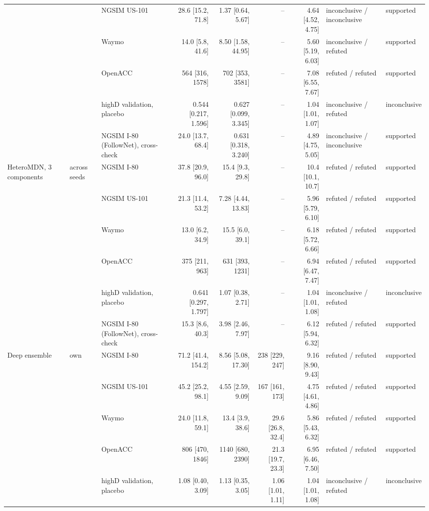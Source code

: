 \begin{longtable}{lllrrrrll}
 &  & NGSIM US-101 & 28.6 [15.2, 71.8] & 1.37 [0.64, 5.67] & -- & 4.64 [4.52, 4.75] & inconclusive / inconclusive & supported \\
 &  & Waymo & 14.0 [5.8, 41.6] & 8.50 [1.58, 44.95] & -- & 5.60 [5.19, 6.03] & inconclusive / refuted & supported \\
 &  & OpenACC & 564 [316, 1578] & 702 [353, 3581] & -- & 7.08 [6.55, 7.67] & refuted / refuted & supported \\
 &  & highD validation, placebo & 0.544 [0.217, 1.596] & 0.627 [0.099, 3.345] & -- & 1.04 [1.01, 1.07] & inconclusive / refuted & inconclusive \\
 &  & NGSIM I-80 (FollowNet), cross-check & 24.0 [13.7, 68.4] & 0.631 [0.318, 3.240] & -- & 4.89 [4.75, 5.05] & inconclusive / inconclusive & supported \\
\midrule
HeteroMDN, 3 components & across seeds & NGSIM I-80 & 37.8 [20.9, 96.0] & 15.4 [9.3, 29.8] & -- & 10.4 [10.1, 10.7] & refuted / refuted & supported \\
 &  & NGSIM US-101 & 21.3 [11.4, 53.2] & 7.28 [4.44, 13.83] & -- & 5.96 [5.79, 6.10] & refuted / refuted & supported \\
 &  & Waymo & 13.0 [6.2, 34.9] & 15.5 [6.0, 39.1] & -- & 6.18 [5.72, 6.66] & refuted / refuted & supported \\
 &  & OpenACC & 375 [211, 963] & 631 [393, 1231] & -- & 6.94 [6.47, 7.47] & refuted / refuted & supported \\
 &  & highD validation, placebo & 0.641 [0.297, 1.797] & 1.07 [0.38, 2.71] & -- & 1.04 [1.01, 1.08] & inconclusive / refuted & inconclusive \\
 &  & NGSIM I-80 (FollowNet), cross-check & 15.3 [8.6, 40.3] & 3.98 [2.46, 7.97] & -- & 6.12 [5.94, 6.32] & refuted / refuted & supported \\
\midrule
Deep ensemble & own & NGSIM I-80 & 71.2 [41.4, 154.2] & 8.56 [5.08, 17.30] & 238 [229, 247] & 9.16 [8.90, 9.43] & refuted / refuted & supported \\
 &  & NGSIM US-101 & 45.2 [25.2, 98.1] & 4.55 [2.59, 9.09] & 167 [161, 173] & 4.75 [4.61, 4.86] & refuted / refuted & supported \\
 &  & Waymo & 24.0 [11.8, 59.1] & 13.4 [3.9, 38.6] & 29.6 [26.8, 32.4] & 5.86 [5.43, 6.32] & refuted / refuted & supported \\
 &  & OpenACC & 806 [470, 1846] & 1140 [680, 2390] & 21.3 [19.7, 23.3] & 6.95 [6.46, 7.50] & refuted / refuted & supported \\
 &  & highD validation, placebo & 1.08 [0.40, 3.09] & 1.13 [0.35, 3.05] & 1.06 [1.01, 1.11] & 1.04 [1.01, 1.08] & inconclusive / refuted & inconclusive \\

\end{longtable}

